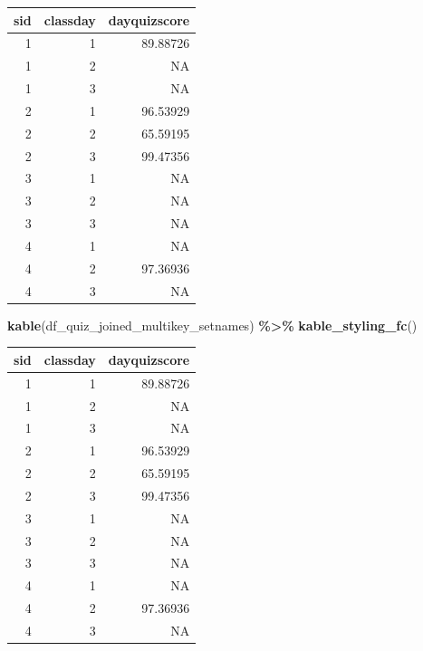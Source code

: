 \documentclass[
]{book}
\newenvironment{Shaded}{\begin{snugshade}}{\end{snugshade}}
\newcommand{\KeywordTok}[1]{\textcolor[rgb]{0.13,0.29,0.53}{\textbf{#1}}}
\newcommand{\NormalTok}[1]{#1}
\newcommand{\OperatorTok}[1]{\textcolor[rgb]{0.81,0.36,0.00}{\textbf{#1}}}
\newcommand{\StringTok}[1]{\textcolor[rgb]{0.31,0.60,0.02}{#1}}
\begin{document}
\begin{table}[!h]
\centering
\begin{tabular}{r|r|r}
\hline
sid & classday & dayquizscore\\
\hline
\rowcolor{gray!6}  1 & 1 & 89.88726\\
\hline
1 & 2 & NA\\
\hline
\rowcolor{gray!6}  1 & 3 & NA\\
\hline
2 & 1 & 96.53929\\
\hline
\rowcolor{gray!6}  2 & 2 & 65.59195\\
\hline
2 & 3 & 99.47356\\
\hline
\rowcolor{gray!6}  3 & 1 & NA\\
\hline
3 & 2 & NA\\
\hline
\rowcolor{gray!6}  3 & 3 & NA\\
\hline
4 & 1 & NA\\
\hline
\rowcolor{gray!6}  4 & 2 & 97.36936\\
\hline
4 & 3 & NA\\
\hline
\end{tabular}
\end{table}

\begin{Shaded}
\begin{Highlighting}[]
\KeywordTok{kable}\NormalTok{(df\_quiz\_joined\_multikey\_setnames) }\OperatorTok{\%\textgreater{}\%}
\StringTok{  }\KeywordTok{kable\_styling\_fc}\NormalTok{()}
\end{Highlighting}
\end{Shaded}

\begin{table}[!h]
\centering
\begin{tabular}{r|r|r}
\hline
sid & classday & dayquizscore\\
\hline
\rowcolor{gray!6}  1 & 1 & 89.88726\\
\hline
1 & 2 & NA\\
\hline
\rowcolor{gray!6}  1 & 3 & NA\\
\hline
2 & 1 & 96.53929\\
\hline
\rowcolor{gray!6}  2 & 2 & 65.59195\\
\hline
2 & 3 & 99.47356\\
\hline
\rowcolor{gray!6}  3 & 1 & NA\\
\hline
3 & 2 & NA\\
\hline
\rowcolor{gray!6}  3 & 3 & NA\\
\hline
4 & 1 & NA\\
\hline
\rowcolor{gray!6}  4 & 2 & 97.36936\\
\hline
4 & 3 & NA\\
\hline
\end{tabular}
\end{table}
\end{document}
